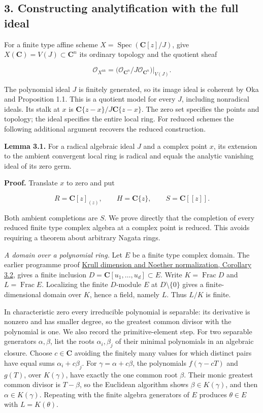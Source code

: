 \documentclass[11pt]{article}
\begin{document}
\subsection{3. Constructing analytification with the full
ideal}\label{constructing-analytification-with-the-full-ideal}

For a finite type affine scheme
\(X=\operatorname{Spec}(\mathbf C[z]/J)\), give
\(X(\mathbf C)=V(J)\subset\mathbf C^n\) its ordinary topology and the
quotient sheaf

\[
\mathcal O_{X^{\mathrm{an}}}
=\bigl(\mathcal O_{\mathbf C^n}/J\mathcal O_{\mathbf C^n}\bigr)|_{V(J)}.
\]

The polynomial ideal \(J\) is finitely generated, so its image ideal is
coherent by Oka and Proposition 1.1. This is a quotient model for every
\(J\), including nonradical ideals. Its stalk at \(x\) is
\(\mathbf C\{z-x\}/J\mathbf C\{z-x\}\). The zero set specifies the
points and topology; the ideal specifies the entire local ring. For
reduced schemes the following additional argument recovers the reduced
construction.

\textbf{Lemma 3.1.} For a radical algebraic ideal \(J\) and a complex
point \(x\), its extension to the ambient convergent local ring is
radical and equals the analytic vanishing ideal of its zero germ.

\textbf{Proof.} Translate \(x\) to zero and put

\[
R=\mathbf C[z]_{(z)},\qquad H=\mathbf C\{z\},\qquad S=\mathbf C[[z]].
\]

Both ambient completions are \(S\). We prove directly that the
completion of every reduced finite type complex algebra at a complex
point is reduced. This avoids requiring a theorem about arbitrary Nagata
rings.

\emph{A domain over a polynomial ring.} Let \(E\) be a finite type
complex domain. The earlier programme proof
\href{../../AG-CA/AG-CA-09.html\#3-normalization-that-respects-ideals}{Krull
dimension and Noether normalization, Corollary 3.2}, gives a finite
inclusion \(D=\mathbf C[u_1,\ldots,u_d]\subset E\). Write
\(K=\operatorname{Frac}D\) and \(L=\operatorname{Frac}E\). Localizing
the finite \(D\)-module \(E\) at \(D\setminus\{0\}\) gives a
finite-dimensional domain over \(K\), hence a field, namely \(L\). Thus
\(L/K\) is finite.

In characteristic zero every irreducible polynomial is separable: its
derivative is nonzero and has smaller degree, so the greatest common
divisor with the polynomial is one. We also record the primitive-element
step. For two separable generators \(\alpha,\beta\), list the roots
\(\alpha_i,\beta_j\) of their minimal polynomials in an algebraic
closure. Choose \(c\in\mathbf C\) avoiding the finitely many values for
which distinct pairs have equal sums \(\alpha_i+c\beta_j\). For
\(\gamma=\alpha+c\beta\), the polynomials \(f(\gamma-cT)\) and \(g(T)\),
over \(K(\gamma)\), have exactly the one common root \(\beta\). Their
monic greatest common divisor is \(T-\beta\), so the Euclidean algorithm
shows \(\beta\in K(\gamma)\), and then \(\alpha\in K(\gamma)\).
Repeating with the finite algebra generators of \(E\) produces
\(\theta\in E\) with \(L=K(\theta)\).
\end{document}
